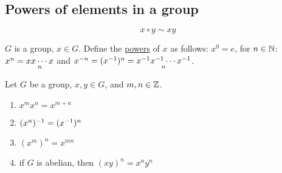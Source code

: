 \documentclass[]{article}
\begin{document}
\subsection{Powers of elements in a group}

$$x\circ y \sim xy$$

$G$ is a group, $x\in G$.
Define the \ul{powers} of $x$ as follows:
$x^0 = e$, for $n\in\mathbb{N}$: $x^n=\underset{n}{xx\cdots x}$ and $x^{-n} = (x^{-1})^n = \underset{n}{x^{-1} x^{-1}\cdots x^{-1}}$.

\begin{theorem}
	Let $G$ be a group, $x,y\in G$, and $m,n\in\mathbb{Z}$.
	\begin{enumerate}
		\item $x^mx^n = x^{m+n}$
		\item $(x^n)^{-1} = (x^{-1})^n$
		\item $(x^m)^n = x^{mn}$
		\item if $G$ is abelian, then $(xy)^n = x^ny^n$
	\end{enumerate}
\end{theorem}
\newpage
\end{document}
